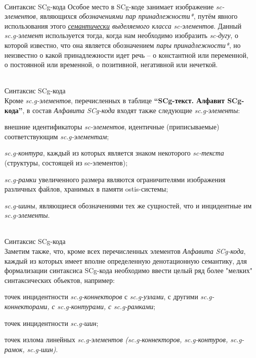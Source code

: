 \begin{frame}{\\Синтаксис SCg-кода}
	\topline
	\justifying
	Особое место в SCg-коде занимает изображение \textit{sc-элементов}, являющихся \textit{обозначениями пар принадлежности*}, путём явного использования этого \textit{\underline{семантически} выделяемого класса sc-элементов}. Данный \textit{sc.g-элемент} используется тогда, когда нам необходимо изобразить \textit{sc-дугу}, о которой известно, что она является обозначением \textit{пары принадлежности*}, но неизвестно о какой принадлежности идет речь – о константной или переменной, о
	постоянной или временной, о позитивной, негативной или нечеткой.
\end{frame}

\begin{frame}{\\Синтаксис SCg-кода}
	\topline
	\justifying
	\vspace*{\fill}\\
	Кроме \textit{sc.g-элементов}, перечисленных в таблице \textbf{“SCg-текст. Алфавит SCg-кода”}, в состав \textit{Алфавита SCg-кода} входят также следующие \textit{sc.g-элементы}:
	\begin{textitemize}
		\item внешние идентификаторы \textit{sc-элементов}, идентичные (приписываемые) соответствующим \textit{sc.g-элементам};
		\item \textit{sc.g-контура}, каждый из которых является знаком некоторого \textit{sc-текста} (структуры, состоящей из sc-элементов);
		\item \textit{sc.g-рамки} увеличенного размера являются ограничителями изображения различных файлов, хранимых в памяти ostis-системы;
		\item \textit{sc.g-шины}, являющиеся обозначениями тех же сущностей, что и инцидентные им \textit{sc.g-элементы}.
	\end{textitemize}
\end{frame}

\begin{frame}{\\Синтаксис SCg-кода}
	\topline
	\justifying
	\vspace*{\fill}\\
	Заметим также, что, кроме всех перечисленных элементов \textit{Алфавита SCg-кода}, каждый из которых имеет вполне определенную денотационную семантику, для формализации синтаксиса SCg-кода необходимо ввести целый ряд более "мелких" синтаксических объектов, например:
	\begin{textitemize}
		\item точек инцидентности \textit{sc.g-коннекторов} с \textit{sc.g-узлами}, с другими \textit{sc.g-коннекторами, с sc.g-контурами, с sc.g-рамками};
		\item точек инцидентности \textit{sc.g-шин};
		\item точек излома линейных \textit{sc.g-элементов (sc.g-коннекторов, sc.g-контуров, sc.g-рамок, sc.g-шин)}.
	\end{textitemize}
\end{frame}

